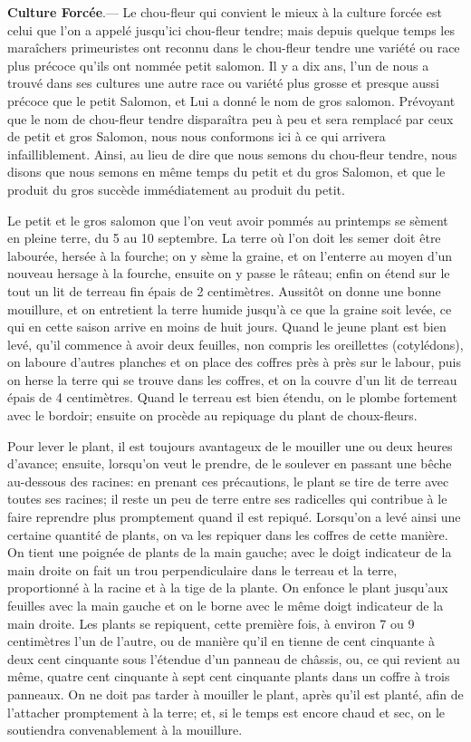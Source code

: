 \documentclass[10pt,a4paper]{book}
\begin{document}
\textbf{Culture Forcée}.--- Le chou-fleur qui convient le mieux à la culture forcée est celui que l'on a appelé jusqu'ici chou-fleur tendre; mais depuis quelque temps les maraîchers primeuristes ont reconnu dans le chou-fleur tendre une variété ou race plus précoce qu'ils ont nommée petit salomon. Il y a dix ans, l'un de nous a trouvé dans ses cultures une autre race ou variété plus grosse et presque aussi précoce que le petit Salomon, et Lui a donné le nom de gros salomon. Prévoyant que le nom de chou-fleur tendre disparaîtra peu à peu et sera remplacé par ceux de petit et gros Salomon, nous nous conformons ici à ce qui arrivera infailliblement. Ainsi, au lieu de dire que nous semons du chou-fleur tendre, nous disons que nous semons en même temps du petit et du gros Salomon, et que le produit du gros succède immédiatement au produit du petit.

Le petit et le gros salomon que l'on veut avoir pommés au printemps se sèment en pleine terre, du 5 au 10 septembre. La terre où l'on doit les semer doit être labourée, hersée à la fourche; on y sème la graine, et on l'enterre au moyen d'un nouveau hersage à la fourche, ensuite on y passe le râteau; enfin on étend sur le tout un lit de terreau fin épais de 2 centimètres. Aussitôt on donne une bonne mouillure, et on entretient la terre humide jusqu'à ce que la graine soit levée, ce qui en cette saison arrive en moins de huit jours. Quand le jeune plant est bien levé, qu'il commence à avoir deux feuilles, non compris les oreillettes (cotylédons), on laboure d'autres planches et on place des coffres près à près sur le labour, puis on herse la terre qui se trouve dans les coffres, et on la couvre d'un lit de terreau épais de 4 centimètres. Quand le terreau est bien étendu, on le plombe fortement avec le bordoir; ensuite on procède au repiquage du plant de choux-fleurs.

Pour lever le plant, il est toujours avantageux de le mouiller une ou deux heures d'avance; ensuite, lorsqu'on veut le prendre, de le soulever en passant une bêche au-dessous des racines: en prenant ces précautions, le plant se tire de terre avec toutes ses racines; il reste un peu de terre entre ses radicelles qui contribue à le faire reprendre plus promptement quand il est repiqué. Lorsqu'on a levé ainsi une certaine quantité de plants, on va les repiquer dans les coffres de cette manière. On tient une poignée de plants de la main gauche; avec le doigt indicateur de la main droite on fait un trou perpendiculaire dans le terreau et la terre, proportionné à la racine et à la tige de la plante. On enfonce le plant jusqu'aux feuilles avec la main gauche et on le borne avec le même doigt indicateur de la main droite. Les plants se repiquent, cette première fois, à environ 7 ou 9 centimètres l'un de l'autre, ou de manière qu'il en tienne de cent cinquante à deux cent cinquante sous l'étendue d'un panneau de châssis, ou, ce qui revient au même, quatre cent cinquante à sept cent cinquante plants dans un coffre à trois panneaux. On ne doit pas tarder à mouiller le plant, après qu'il est planté, afin de l'attacher promptement à la terre; et, si le temps est encore chaud et sec, on le soutiendra convenablement à la mouillure.
\end{document}
